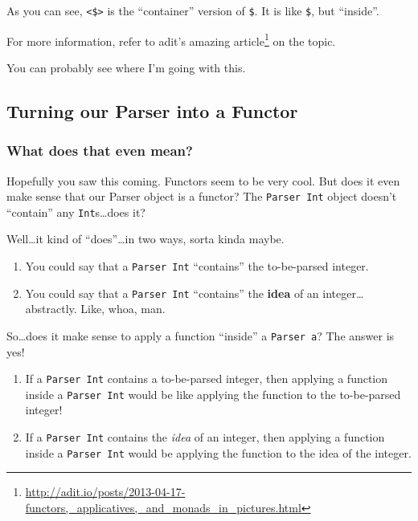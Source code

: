 \documentclass[]{article}
\renewcommand{\href}[2]{#2\footnote{\url{#1}}}
\begin{document}
As you can see, \texttt{\textless{}\$\textgreater{}} is the ``container'' version of \texttt{\$}. It
is like \texttt{\$}, but ``inside''.

For more information, refer to adit's
\href{http://adit.io/posts/2013-04-17-functors,_applicatives,_and_monads_in_pictures.html}{amazing
article} on the topic.

You can probably see where I'm going with this.

\subsection{Turning our Parser into a Functor}\label{turning-our-parser-into-a-functor}

\subsubsection{What does that even mean?}\label{what-does-that-even-mean}

Hopefully you saw this coming. Functors seem to be very cool. But does it even make sense that our
Parser object is a functor? The \texttt{Parser\ Int} object doesn't ``contain'' any
\texttt{Int}s\ldots{}does it?

Well\ldots{}it kind of ``does''\ldots{}in two ways, sorta kinda maybe.

\begin{enumerate}
\def\labelenumi{\arabic{enumi}.}
\tightlist
\item
  You could say that a \texttt{Parser\ Int} ``contains'' the to-be-parsed integer.
\item
  You could say that a \texttt{Parser\ Int} ``contains'' the \textbf{idea} of an
  integer\ldots{}abstractly. Like, whoa, man.
\end{enumerate}

So\ldots{}does it make sense to apply a function ``inside'' a \texttt{Parser\ a}? The answer is yes!

\begin{enumerate}
\def\labelenumi{\arabic{enumi}.}
\tightlist
\item
  If a \texttt{Parser\ Int} contains a to-be-parsed integer, then applying a function inside a
  \texttt{Parser\ Int} would be like applying the function to the to-be-parsed integer!
\item
  If a \texttt{Parser\ Int} contains the \emph{idea} of an integer, then applying a function inside
  a \texttt{Parser\ Int} would be applying the function to the idea of the integer.
\end{enumerate}
\end{document}
